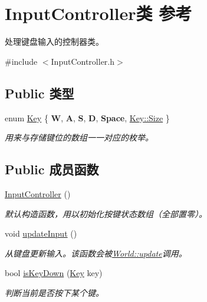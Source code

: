 \hypertarget{class_input_controller}{}\section{Input\+Controller类 参考}
\label{class_input_controller}


处理键盘输入的控制器类。  




{\ttfamily \#include $<$Input\+Controller.\+h$>$}

\subsection*{Public 类型}
\begin{DoxyCompactItemize}
\item 
enum \hyperlink{class_input_controller_a840a7425e2220e1ef5659a7ea4ba122d}{Key} \{ \newline
{\bfseries W}, 
{\bfseries A}, 
{\bfseries S}, 
{\bfseries D}, 
\newline
{\bfseries Space}, 
\hyperlink{class_input_controller_a840a7425e2220e1ef5659a7ea4ba122da6f6cb72d544962fa333e2e34ce64f719}{Key\+::\+Size}
 \}\begin{DoxyCompactList}\small\item\em 用来与存储键位的数组一一对应的枚举。 \end{DoxyCompactList}
\end{DoxyCompactItemize}
\subsection*{Public 成员函数}
\begin{DoxyCompactItemize}
\item 
\hyperlink{class_input_controller_aba927fffeb0bf4c4fd0835d4dfbdfaec}{Input\+Controller} ()
\begin{DoxyCompactList}\small\item\em 默认构造函数，用以初始化按键状态数组（全部置零）。 \end{DoxyCompactList}\item 
void \hyperlink{class_input_controller_a2a88542ae1370cf3f5ace3c4bb8813d9}{update\+Input} ()
\begin{DoxyCompactList}\small\item\em 从键盘更新输入。该函数会被\hyperlink{class_world_aac8c1fde63c06577ffc648aaefdb37f0}{World\+::update}调用。 \end{DoxyCompactList}\item 
bool \hyperlink{class_input_controller_a7ed265c719c06edf5a7294e98739d932}{is\+Key\+Down} (\hyperlink{class_input_controller_a840a7425e2220e1ef5659a7ea4ba122d}{Key} key)
\begin{DoxyCompactList}\small\item\em 判断当前是否按下某个键。 \end{DoxyCompactList}\end{DoxyCompactItemize}
